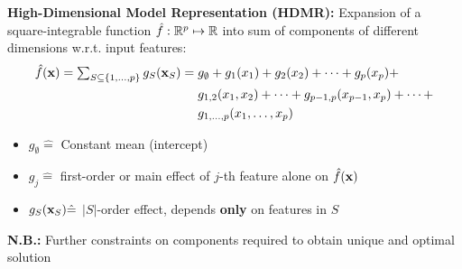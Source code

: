 \documentclass[11pt,compress,t,notes=noshow, aspectratio=169, xcolor=table]{beamer}
\newcommand{\open}{}
\newcommand{\close}{}
\begin{document}
\begin{frame}
\textbf{High-Dimensional Model Representation (HDMR):} Expansion of a square-integrable function $\fh: \mathbb{R}^p \mapsto \mathbb{R}$ into sum of components of different dimensions w.r.t. input features:
\begin{equation*}
\begin{split}
\fh(\xv) =  %
\textstyle\sum_{S \subseteq \{1,\ldots,p\}} g_{S}(\xv_S) = \; & g_{\open \emptyset \close} + g_{\open 1 \close}(x_1) + g_{\open 2 \close}(x_2) + \dots + g_{\open p \close}(x_p) + \\
& g_{\open 1, 2 \close}(x_1, x_2) + \dots + g_{\open p-1, p \close}(x_{p-1}, x_p) + \dots + \\
& g_{\open 1,\ldots,p \close}(x_1, \ldots, x_p)
\end{split}
\end{equation*}
\vspace{-5pt}%
\begin{itemize}
\item $g_{\open \emptyset \close} \hat = $ Constant mean (intercept) %
\item $g_{\open j \close} \hat = $ first-order or main effect of $j$-th feature alone on $\fh(\xv)$
\item $g_{S}(\xv_S) \hat = $ $|S|$-order effect, depends \textbf{only} on features in $S$ %
\end{itemize}

\textbf{N.B.:} Further constraints on components required to obtain unique and optimal solution
\end{frame}
\end{document}
